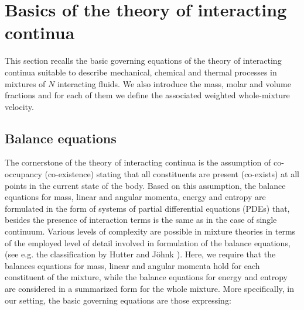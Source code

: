 \documentclass[a4paper]{article}
\begin{document}
\section{Basics of the theory of interacting continua}
\label{sec-basics}
This section recalls the basic governing equations of  the theory of interacting continua suitable to describe mechanical, chemical and thermal processes in mixtures of $N$ interacting fluids. We also introduce the mass, molar and volume fractions and for each of them we define the associated weighted whole-mixture velocity.  

\subsection{Balance equations}
The cornerstone of the theory of interacting continua is the assumption of co-occupancy (co-existence) stating that all constituents are present (co-exists) at all points in the current state of the body. Based on this assumption, the balance equations for mass, linear and angular momenta, energy and  entropy are formulated in the form of systems of partial differential equations (PDEs) that, besides the presence of interaction terms is the same as in the case of single continuum. Various levels of complexity are possible in mixture theories in terms of the employed level of detail involved in formulation of the balance equations, (see e.g. the classification by Hutter and J\"ohnk \cite{hutter.k.johnk.k:continuum}). Here, we require that the balances equations for mass, linear and angular momenta hold for each constituent of the mixture, while the balance equations for energy and entropy are considered in a summarized form for the whole mixture. More specifically, in our setting, the basic governing equations are those expressing:
\end{document}
